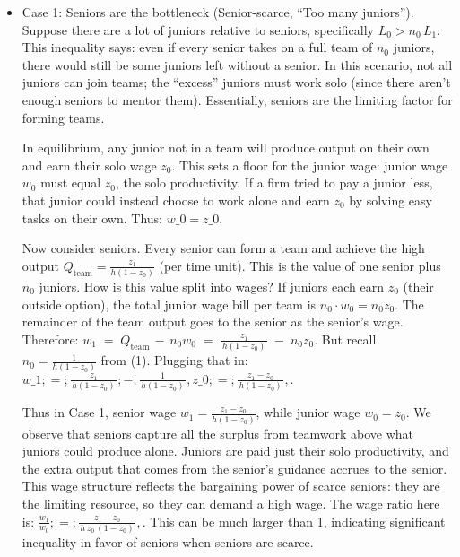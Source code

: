 \documentclass[12pt]{article}
\begin{document}
\begin{itemize}
\item
  {Case 1: Seniors are the bottleneck (Senior-scarce, ``Too many
  juniors'').} Suppose there are a lot of juniors relative to seniors,
  specifically \(L_0 > n_0 \,L_1\). This inequality says: even if every
  senior takes on a full team of \(n_0\) juniors, there would still be
  some juniors left without a senior. In this scenario, {not all
  juniors can join teams}; the ``excess'' juniors must work solo (since
  there aren't enough seniors to mentor them). Essentially, seniors are
  the limiting factor for forming teams.

  In equilibrium, any junior {not} in a team will produce output on
  their own and earn their solo wage \(z_0\). This sets a floor for the
  junior wage: {junior wage \(w_0\) must equal \(z_0\)}, the solo
  productivity. If a firm tried to pay a junior less, that junior could
  instead choose to work alone and earn \(z_0\) by solving easy tasks on
  their own. Thus: $ w\_0 = z\_0. \tag{3}$

  Now consider seniors. Every senior can form a team and achieve the
  high output \(Q_{\text{team}} = \frac{z_1}{h(1-z_0)}\) (per time
  unit). This is the {value of one senior plus \(n_0\) juniors}.
  How is this value split into wages? If juniors each earn \(z_0\)
  (their outside option), the total junior wage bill per team is
  \(n_0 \cdot w_0 = n_0 z_0\). The remainder of the team output goes to
  the senior as the senior's wage. Therefore:
  \(w_1 \;=\; Q_{\text{team}} \,-\, n_0 w_0 \;=\; \frac{z_1}{\,h(1-z_0)\,} \;-\; n_0 z_0.\)
  But recall \(n_0 = \frac{1}{h(1-z_0)}\) from (1). Plugging that in: $
  w\_1 ;=; \frac{z_1}{\,h(1-z_0)\,} ;-; \frac{1}{\,h(1-z_0)\,} ,z\_0 ;=;
  \frac{z_1 - z_0}{\,h(1-z_0)\,},. \tag{4}$

  Thus in Case 1, {senior wage}
  \(w_1 = \frac{z_1 - z_0}{h(1-z_0)}\), while {junior wage}
  \(w_0 = z_0\). We observe that seniors capture all the {surplus}
  from teamwork above what juniors could produce alone. Juniors are paid
  just their solo productivity, and the extra output that comes from the
  senior's guidance accrues to the senior. This wage structure reflects
  the {bargaining power of scarce seniors}: they are the limiting
  resource, so they can demand a high wage. The {wage ratio} here
  is: $ \frac{w_1}{w_0} ;=; \frac{z_1 - z_0}{\,h\,z_0\,(1-z_0)\,},.
  \tag{5}$ This can be much larger than 1, indicating significant
  inequality in favor of seniors when seniors are scarce.


\end{itemize}
\end{document}
